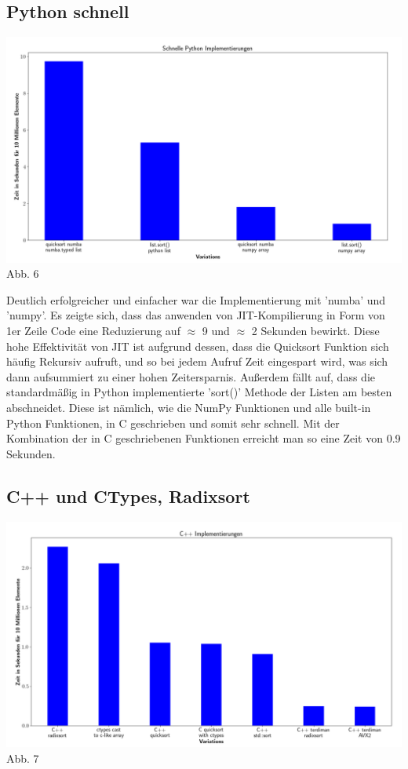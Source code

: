 \documentclass[12pt,a4paper]{article}
\begin{document}
\subsection{Python schnell}

\begin{center}
    \hspace*{-1.5cm}\includegraphics[width=1.2\textwidth]{./diagramme/matplotlib/pythonschnell.png}
    Abb. 6
\end{center}

Deutlich erfolgreicher und einfacher war die Implementierung mit 'numba' und 'numpy'.
Es zeigte sich, dass das anwenden von JIT-Kompilierung in Form von 1er Zeile Code
eine Reduzierung auf $\approx$ 9 und $\approx$ 2 Sekunden bewirkt. Diese hohe Effektivität von JIT
ist aufgrund dessen, dass die Quicksort Funktion sich häufig Rekursiv aufruft, und so bei jedem Aufruf
Zeit eingespart wird, was sich dann aufsummiert zu einer hohen Zeitersparnis.
Außerdem fällt auf, dass die standardmäßig in Python implementierte 'sort()' Methode der Listen
am besten abschneidet. Diese ist nämlich, wie die NumPy Funktionen und alle built-in Python Funktionen, in C geschrieben und
somit sehr schnell. Mit der Kombination der in C geschriebenen Funktionen erreicht man so eine Zeit von 0.9 Sekunden.

\subsection{C++ und CTypes, Radixsort}

\begin{center}
    \hspace*{-1.5cm}\includegraphics[width=1.2\textwidth]{./diagramme/matplotlib/cpp.png}
    Abb. 7
\end{center}
\end{document}
